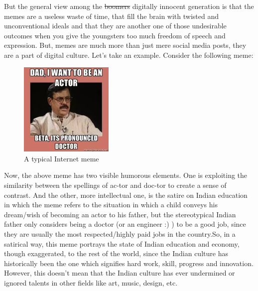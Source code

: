 \documentclass{article}
\begin{document}
But the general view among the \st{boomers} digitally innocent generation is that the memes are a useless waste of time, that fill the brain with twisted and unconventional ideals and that they are another one of those undesirable outcomes when you give the youngsters too much freedom of speech and expression. But, memes are much more than just mere social media posts, they are a part of digital culture. Let's take an example. Consider the following meme:

\begin{figure}[H]
    \centering
    \includegraphics[width=0.4\textwidth]{figures/meme1.png}
    \caption{A typical Internet meme}
\end{figure}

Now, the above meme has two visible humorous elements. One is exploiting the similarity between the spellings of ac-tor and doc-tor to create a sense of contrast. And the other, more intellectual one, is the satire on Indian education in which the meme refers to the situation in which a child conveys his dream/wish of becoming an actor to his father, but the stereotypical Indian father only considers being a doctor (or an engineer :) ) to be a good job, since they are usually the most respected/highly paid jobs in the country.So, in a satirical way, this meme portrays the state of Indian education and economy, though exaggerated, to the rest of the world, since the Indian culture has historically been the one which signifies hard work, skill, progress and innovation. However, this doesn't mean that the Indian culture has ever undermined or ignored talents in other fields like art, music, design, etc.
\end{document}
